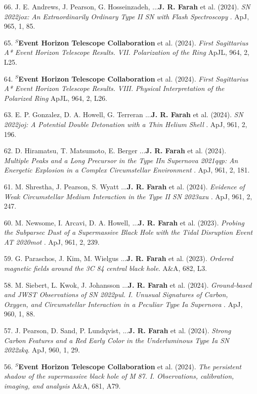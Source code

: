 \documentclass[margin,line]{res}
\begin{document}
\begin{resume}
66. J. E. Andrews, J. Pearson, G. Hosseinzadeh, ...\textbf{J. R. Farah} et al. (2024). \textit{ SN 2022jox: An Extraordinarily Ordinary Type II SN with Flash Spectroscopy }. ApJ, 965, 1, 85.


65. \textbf{$^S$Event Horizon Telescope Collaboration} et al. (2024). \textit{ First Sagittarius A* Event Horizon Telescope Results. VII. Polarization of the Ring } ApJL, 964, 2, L25.

64. \textbf{$^S$Event Horizon Telescope Collaboration} et al. (2024). \textit{ First Sagittarius A* Event Horizon Telescope Results. VIII. Physical Interpretation of the Polarized Ring } ApJL, 964, 2, L26.

63. E. P. Gonzalez, D. A. Howell, G. Terreran ...\textbf{J. R. Farah} et al. (2024). \textit{ SN 2022joj: A Potential Double Detonation with a Thin Helium Shell  }. ApJ, 961, 2, 196.

62. D. Hiramatsu, T. Matsumoto, E. Berger ...\textbf{J. R. Farah} et al. (2024). \textit{ Multiple Peaks and a Long Precursor in the Type IIn Supernova 2021qqp: An Energetic Explosion in a Complex Circumstellar Environment   }. ApJ, 961, 2, 181.

61. M. Shrestha, J. Pearson, S. Wyatt ...\textbf{J. R. Farah} et al. (2024). \textit{ Evidence of Weak Circumstellar Medium Interaction in the Type II SN 2023axu  }. ApJ, 961, 2, 247.

60. M. Newsome, I. Arcavi, D. A. Howell, ...\textbf{J. R. Farah} et al. (2023). \textit{ Probing the Subparsec Dust of a Supermassive Black Hole with the Tidal Disruption Event AT 2020mot }. ApJ, 961, 2, 239.

59. G. Paraschos, J. Kim, M. Wielgus ...\textbf{J. R. Farah} et al. (2023). \textit{ Ordered magnetic fields around the 3C 84 central black hole}. A\&A, 682, L3.

58. M. Siebert, L. Kwok, J. Johansson ...\textbf{J. R. Farah} et al. (2024). \textit{Ground-based and JWST Observations of SN 2022pul. I. Unusual Signatures of Carbon, Oxygen, and Circumstellar Interaction in a Peculiar Type Ia Supernova }. ApJ, 960, 1, 88.

57. J. Pearson, D. Sand, P. Lundqvist, ...\textbf{J. R. Farah} et al. (2024). \textit{Strong Carbon Features and a Red Early Color in the Underluminous Type Ia SN 2022xkq}. ApJ, 960, 1, 29.

56. \textbf{$^S$Event Horizon Telescope Collaboration} et al. (2024). \textit{The persistent shadow of the supermassive black hole of M 87. I. Observations, calibration, imaging, and analysis } A\&A, 681, A79.


\end{resume}
\end{document}
